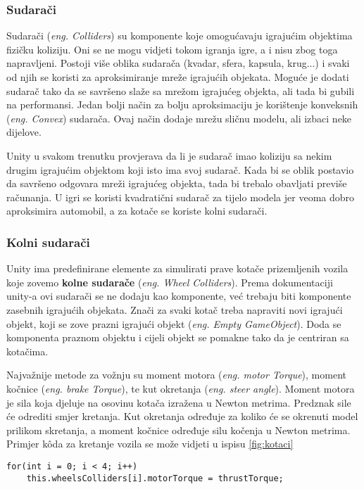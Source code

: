 \subsubsection{Sudarači}
Sudarači (\emph{eng. Colliders}) su komponente koje omogućavaju igrajućim objektima fizičku koliziju. Oni se ne mogu vidjeti tokom igranja igre, a i nisu zbog toga napravljeni. Postoji više oblika sudarača (kvadar, sfera, kapsula, krug...) i svaki od njih se koristi za aproksimiranje mreže igrajućih objekata. Moguće je dodati sudarač tako da se savršeno slaže sa mrežom igrajućeg objekta, ali tada bi gubili na performansi. Jedan bolji način za bolju aproksimaciju je korištenje konveksnih (\emph{eng. Convex}) sudarača. Ovaj način dodaje mrežu sličnu modelu, ali izbaci neke dijelove. \par
Unity u svakom trenutku provjerava da li je sudarač imao koliziju sa nekim drugim igrajućim objektom koji isto ima svoj sudarač. Kada bi se oblik postavio da savršeno odgovara mreži igrajućeg objekta, tada bi trebalo obavljati previše računanja. U igri se koristi kvadratični sudarač za tijelo modela jer veoma dobro aproksimira automobil, a za kotače se koriste kolni sudarači.
\subsubsection{Kolni sudarači}
Unity ima predefinirane elemente za simulirati prave kotače prizemljenih vozila koje zovemo \textbf{kolne sudarače} (\emph{eng. Wheel Colliders}). Prema dokumentaciji unity-a ovi sudarači se ne dodaju kao komponente, već trebaju biti komponente zasebnih igrajućih objekata. Znači za svaki kotač treba napraviti novi igrajući objekt, koji se zove prazni igrajući objekt (\emph{eng. Empty GameObject}). Doda se komponenta praznom objektu i cijeli objekt se pomakne tako da je centriran sa kotačima. \newpage \par
Najvažnije metode za vožnju su moment motora (\emph{eng. motor Torque}), moment kočnice (\emph{eng. brake Torque}), te kut okretanja (\emph{eng. steer angle}). Moment motora je sila koja djeluje na osovinu kotača izražena u Newton metrima. Predznak sile će odrediti smjer kretanja. Kut okretanja određuje za koliko će se okrenuti model prilikom skretanja, a moment kočnice određuje silu kočenja u Newton metrima. Primjer k\^oda za kretanje vozila se može vidjeti u ispisu \ref{fig:kotaci}

\begin{lstlisting}[caption={Skripta za kretanje vozila}, label=kretanjeVozila]
for(int i = 0; i < 4; i++)
    this.wheelsColliders[i].motorTorque = thrustTorque;
\end{lstlisting}

